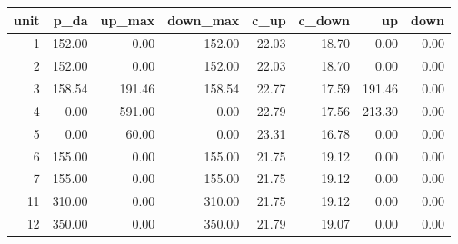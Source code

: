 \begin{tabular}{rrrrrrrr}
\toprule
unit & p\_da & up\_max & down\_max & c\_up & c\_down & up & down \\
\midrule
1 & 152.00 & 0.00 & 152.00 & 22.03 & 18.70 & 0.00 & 0.00 \\
2 & 152.00 & 0.00 & 152.00 & 22.03 & 18.70 & 0.00 & 0.00 \\
3 & 158.54 & 191.46 & 158.54 & 22.77 & 17.59 & 191.46 & 0.00 \\
4 & 0.00 & 591.00 & 0.00 & 22.79 & 17.56 & 213.30 & 0.00 \\
5 & 0.00 & 60.00 & 0.00 & 23.31 & 16.78 & 0.00 & 0.00 \\
6 & 155.00 & 0.00 & 155.00 & 21.75 & 19.12 & 0.00 & 0.00 \\
7 & 155.00 & 0.00 & 155.00 & 21.75 & 19.12 & 0.00 & 0.00 \\
11 & 310.00 & 0.00 & 310.00 & 21.75 & 19.12 & 0.00 & 0.00 \\
12 & 350.00 & 0.00 & 350.00 & 21.79 & 19.07 & 0.00 & 0.00 \\
\bottomrule
\end{tabular}
